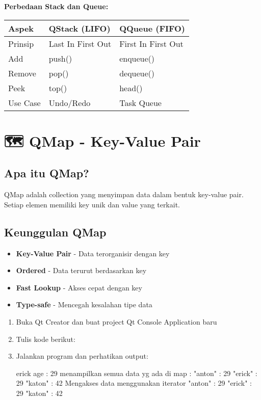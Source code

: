 \textbf{Perbedaan Stack dan Queue:}

\begin{center}
\begin{tabular}{|l|l|l|}
\hline
\textbf{Aspek} & \textbf{QStack (LIFO)} & \textbf{QQueue (FIFO)} \\
\hline
Prinsip & Last In First Out & First In First Out \\
\hline
Add & push() & enqueue() \\
\hline
Remove & pop() & dequeue() \\
\hline
Peek & top() & head() \\
\hline
Use Case & Undo/Redo & Task Queue \\
\hline
\end{tabular}
\end{center}

\section{🗺️ QMap - Key-Value Pair}

\subsection{Apa itu QMap?}

QMap adalah collection yang menyimpan data dalam bentuk key-value pair. Setiap elemen memiliki key unik dan value yang terkait.

\subsection{Keunggulan QMap}

\begin{itemize}
\item \textbf{Key-Value Pair} - Data terorganisir dengan key
\item \textbf{Ordered} - Data terurut berdasarkan key
\item \textbf{Fast Lookup} - Akses cepat dengan key
\item \textbf{Type-safe} - Mencegah kesalahan tipe data
\end{itemize}

\begin{enumerate}
\item Buka Qt Creator dan buat project Qt Console Application baru
\item Tulis kode berikut:



\item Jalankan program dan perhatikan output:

\begin{lcverbatim}
erick age :  29
menampilkan semua data yg ada di map :
"anton"  :  29
"erick"  :  29
"katon"  :  42
Mengakses data menggunakan iterator
"anton"  :  29
"erick"  :  29
"katon"  :  42
\end{lcverbatim}
\end{enumerate}

